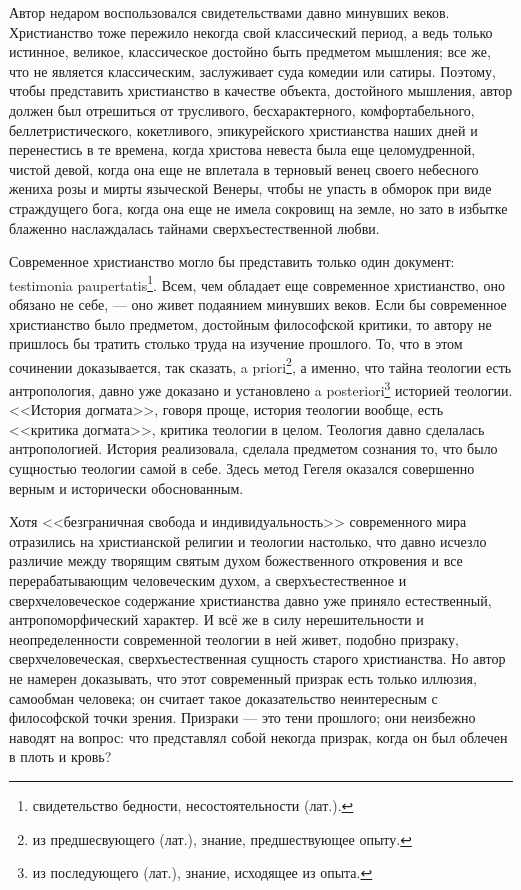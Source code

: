 \documentclass[12pt,oneside]{book}
\begin{document}
Автор недаром воспользовался свидетельствами давно минувших веков. Христианство тоже пережило некогда свой классический период, а ведь только истинное, великое, классическое достойно быть предметом мышления; все же, что не является классическим, заслуживает суда комедии или сатиры. Поэтому, чтобы представить христианство в качестве объекта, достойного мышления, автор должен был отрешиться от трусливого, бесхарактерного, комфортабельного, беллетристического, кокетливого, эпикурейского христианства наших дней и перенестись в те времена, когда христова невеста была еще целомудренной, чистой девой, когда она еще не вплетала в терновый венец своего небесного жениха розы и мирты языческой Венеры, чтобы не упасть в обморок при виде страждущего бога, когда она еще не имела сокровищ на земле, но зато в избытке блаженно наслаждалась тайнами сверхъестественной любви.

Современное христианство могло бы представить только один документ: testimonia paupertatis\footnote{свидетельство бедности, несостоятельности (лат.).}. Всем, чем обладает еще современное христианство, оно обязано не себе, --- оно живет подаянием минувших веков. Если бы современное христианство было предметом, достойным философской критики, то автору не пришлось бы тратить столько труда на изучение прошлого. То, что в этом сочинении доказывается, так сказать, a priori\footnote{из предшесвующего (лат.), знание, предшествующее опыту.}, а именно, что тайна теологии есть антропология, давно уже доказано и установлено a posteriori\footnote{из последующего (лат.), знание, исходящее из опыта.} историей теологии. <<История догмата>>, говоря проще, история теологии вообще, есть <<критика догмата>>, критика теологии в целом. Теология давно сделалась антропологией. История реализовала, сделала предметом сознания то, что было сущностью теологии самой в себе. Здесь метод Гегеля оказался совершенно верным и исторически обоснованным.

Хотя <<безграничная свобода и индивидуальность>> современного мира отразились на христианской религии и теологии настолько, что давно исчезло различие между творящим святым духом божественного откровения и все перерабатывающим человеческим духом, а сверхъестественное и сверхчеловеческое содержание христианства давно уже приняло естественный, антропоморфический характер. И всё же в силу нерешительности и неопределенности современной теологии в ней живет, подобно призраку, сверхчеловеческая, сверхъестественная сущность старого христианства. Но автор не намерен доказывать, что этот современный призрак есть только иллюзия, самообман человека; он считает такое доказательство неинтересным с философской точки зрения. Призраки --- это тени прошлого; они неизбежно наводят на вопрос: что представлял собой некогда призрак, когда он был облечен в плоть и кровь?
\end{document}
